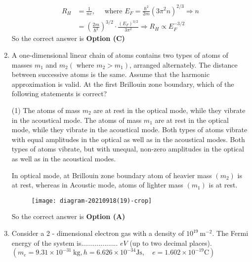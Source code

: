 \begin{enumerate}
\begin{answer}
\begin{align*}
R_{H}&=\frac{1}{n e}, \quad\text{ where }E_{F}=\frac{\hbar^{2}}{2 m}\left(3 \pi^{2} n\right)^{2 / 3} \Rightarrow n\\&=\left(\frac{2 m}{\hbar^{2}}\right)^{3 / 2} \cdot \frac{\left(E_{F}\right)^{3 / 2}}{3 \pi^{2}} \Rightarrow R_{H} \propto E_{F}^{-3 / 2}
\end{align*}
So the correct answer is \textbf{Option (C)}
\end{answer}
	\item A one-dimensional linear chain of atoms contains two types of atoms of masses $m_{1}$ and $m_{2}\left(\right.$ where $\left.m_{2}>m_{1}\right)$, arranged alternately. The distance between successive atoms is the same. Assume that the harmonic approximation is valid. At the first Brillouin zone boundary, which of the following statements is correct?
{	}
\begin{tasks}(1)
\task[\textbf{A.}]  The atoms of mass $m_{2}$ are at rest in the optical mode, while they vibrate in the acoustical mode.
\task[\textbf{B.}]  The atoms of mass $m_{1}$ are at rest in the optical mode, while they vibrate in the acoustical mode.
\task[\textbf{C.}] Both types of atoms vibrate with equal amplitudes in the optical as well as in the acoustical modes.
\task[\textbf{D.}] Both types of atoms vibrate, but with unequal, non-zero amplitudes in the optical as well as in the acoustical modes.
\end{tasks}
\begin{answer}
In optical mode, at Brillouin zone boundary atom of heavier mass $\left(m_{2}\right)$ is at rest, whereas in Acoustic mode, atoms of lighter mass $\left(m_{1}\right)$ is at rest.\\
\begin{figure}[H]
	\centering
	\texttt{[image: diagram-20210918(19)-crop]}
\end{figure}
So the correct answer is \textbf{Option (A)}
\end{answer}
	\item Consider a 2 - dimensional electron gas with a density of $10^{19} \mathrm{~m}^{-2}$. The Fermi energy of the system is................... $e V$ (up to two decimal places).\\
	$\left(m_{e}=9.31 \times 10^{-31} \mathrm{~kg}, h=6.626 \times 10^{-34} \mathrm{Js}, \quad e=1.602 \times 10^{-19} \mathrm{C}\right)$
{	}
\begin{answer}

\end{answer}
\end{enumerate}
